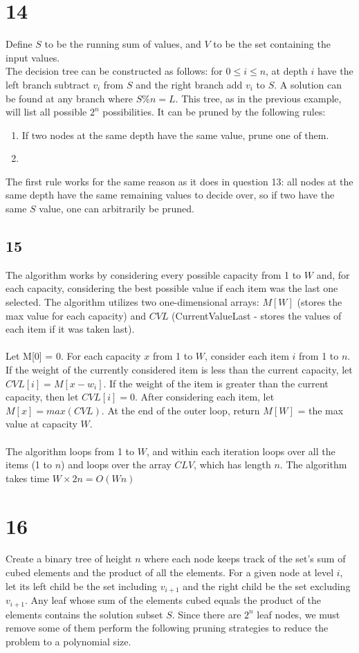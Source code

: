 \documentclass[letterpaper,notitlepage,twoside]{article}
\begin{document}
\section*{14}
Define $S$ to be the running sum of values, and $V$ to be the set containing the input values. \\
The decision tree can be constructed as follows: for $0\leq i \leq n$, at depth $i$ have the left branch subtract $v_i$ from $S$ and the right branch add $v_i$ to $S$. A solution can be found at any branch where $S\% n = L$. This tree, as in the previous example, will list all possible $2^n$ possibilities. It can be pruned by the following rules:   
\begin{enumerate}
\item If two nodes at the same depth have the same value, prune one of them. 
\item
\end{enumerate}
The first rule works for the same reason as it does in question 13: all nodes at the same depth have the same remaining values to decide over, so if two have the same $S$ value, one can arbitrarily be pruned.

\subsection*{15}
The algorithm works by considering every possible capacity from 1 to $W$ and, for each capacity, considering the best possible value if each item was the last one selected. The algorithm utilizes two one-dimensional arrays: $M[W]$ (stores the max value for each capacity) and $CVL$ (CurrentValueLast - stores the values of each item if it was taken last). \\ \\
Let M[0] = 0. For each capacity $x$ from 1 to $W$, consider each item $i$ from 1 to $n$. If the weight of the currently considered item is less than the current capacity, let $CVL[i] = M[x - w_i]$. If the weight of the item is greater than the current capacity, then let $CVL[i] = 0$. After considering each item, let $M[x] = max(CVL)$. At the end of the outer loop, return $M[W]$ = the max value at capacity $W$. \\ \\
The algorithm loops from 1 to $W$, and within each iteration loops over all the items (1 to $n$) and loops over the array $CLV$, which has length $n$. The algorithm takes time $W \times 2n = O(Wn)$

\section*{16}
Create a binary tree of height $n$ where each node keeps track of the set's sum of cubed elements and the product of all the elements. For a given node at level $i$, let its left child be the set including $v_{i + 1}$ and the right child be the set excluding $v_{i + 1}$. Any leaf whose sum of the elements cubed equals the product of the elements contains the solution subset $S$. Since there are $2^n$ leaf nodes, we must remove some of them perform the following pruning strategies to reduce the problem to a polynomial size.
\end{document}
